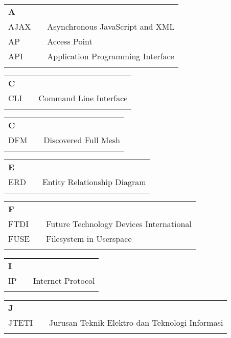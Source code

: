 \noindent

\begin{tabular}{p{20pt}p{3pt}l}
	\textbf{A}\\
	AJAX & & Asynchronous JavaScript and XML\\
	AP & & Access Point\\
	API & & Application Programming Interface\\
	\\
\end{tabular}

\begin{tabular}{p{20pt}p{3pt}l}
	\textbf{C}\\
	CLI & & Command Line Interface\\
	\\
\end{tabular}

\begin{tabular}{p{20pt}p{3pt}l}
	\textbf{C}\\
	DFM & & Discovered Full Mesh\\
	\\
\end{tabular}

\begin{tabular}{p{20pt}p{3pt}l}
	\textbf{E}\\
	ERD & & Entity Relationship Diagram\\
	\\
\end{tabular}

\begin{tabular}{p{20pt}p{3pt}l}
	\textbf{F}\\
	FTDI & & Future Technology Devices International\\
	FUSE & & Filesystem in Userspace\\
	\\
\end{tabular}

\begin{tabular}{p{20pt}p{3pt}l}
	\textbf{I}\\
	IP & & Internet Protocol\\
	\\
\end{tabular}

\begin{tabular}{p{20pt}p{3pt}l}
	\textbf{J}\\
	JTETI & & Jurusan Teknik Elektro dan Teknologi Informasi\\
	\\
\end{tabular}

